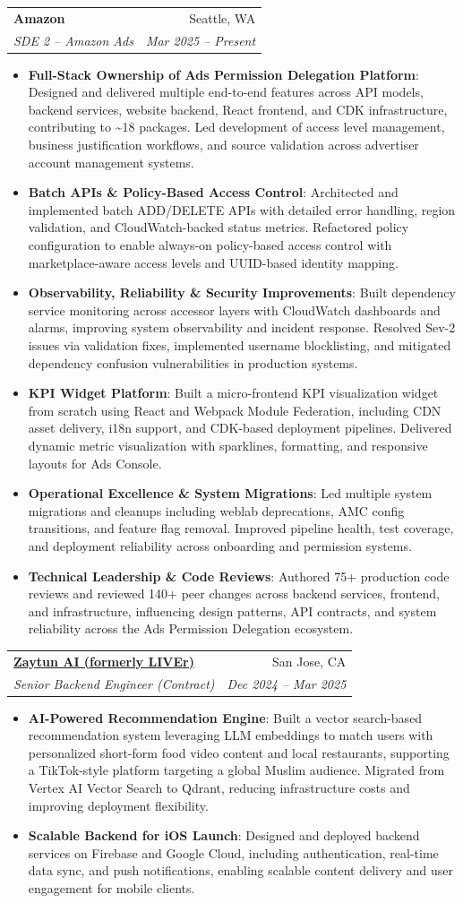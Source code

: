 \documentclass[letterpaper,11pt]{article}
\makeatletter
\newcommand{\resumeItem}[2]{
  \item\small{
    \textbf{#1}{: #2 \vspace{-2pt}}
  }
}
\newcommand{\resumeSubheading}[4]{
  \vspace{-1pt}\item
    \begin{tabular*}{0.97\textwidth}{l@{\extracolsep{\fill}}r}
      \textbf{#1} & #2 \\
      \textit{\small#3} & \textit{\small #4} \\
    \end{tabular*}\vspace{-5pt}
}
\newcommand{\resumeItemListStart}{\begin{itemize}}
\newcommand{\resumeItemListEnd}{\end{itemize}\vspace{-5pt}}
\makeatother
\begin{document}
    \resumeSubheading
      {Amazon}{Seattle, WA}
      {SDE 2 -- Amazon Ads}{Mar 2025 -- Present}
      \resumeItemListStart
        \resumeItem{Full-Stack Ownership of Ads Permission Delegation Platform}
          {Designed and delivered multiple end-to-end features across API models, backend services, website backend, React frontend, and CDK infrastructure, contributing to \textasciitilde18 packages. Led development of access level management, business justification workflows, and source validation across advertiser account management systems.}
        \resumeItem{Batch APIs \& Policy-Based Access Control}
          {Architected and implemented batch ADD/DELETE APIs with detailed error handling, region validation, and CloudWatch-backed status metrics. Refactored policy configuration to enable always-on policy-based access control with marketplace-aware access levels and UUID-based identity mapping.}
        \resumeItem{Observability, Reliability \& Security Improvements}
          {Built dependency service monitoring across accessor layers with CloudWatch dashboards and alarms, improving system observability and incident response. Resolved Sev-2 issues via validation fixes, implemented username blocklisting, and mitigated dependency confusion vulnerabilities in production systems.}
        \resumeItem{KPI Widget Platform}
          {Built a micro-frontend KPI visualization widget from scratch using React and Webpack Module Federation, including CDN asset delivery, i18n support, and CDK-based deployment pipelines. Delivered dynamic metric visualization with sparklines, formatting, and responsive layouts for Ads Console.}
        \resumeItem{Operational Excellence \& System Migrations}
          {Led multiple system migrations and cleanups including weblab deprecations, AMC config transitions, and feature flag removal. Improved pipeline health, test coverage, and deployment reliability across onboarding and permission systems.}
        \resumeItem{Technical Leadership \& Code Reviews}
          {Authored 75+ production code reviews and reviewed 140+ peer changes across backend services, frontend, and infrastructure, influencing design patterns, API contracts, and system reliability across the Ads Permission Delegation ecosystem.}
      \resumeItemListEnd

    \resumeSubheading
      {\href{https://zaytun.ai/}{Zaytun AI (formerly LIVEr)}}{San Jose, CA}
      {Senior Backend Engineer (Contract)}{Dec 2024 -- Mar 2025}
      \resumeItemListStart
        \resumeItem{AI-Powered Recommendation Engine}
          {Built a vector search-based recommendation system leveraging LLM embeddings to match users with personalized short-form food video content and local restaurants, supporting a TikTok-style platform targeting a global Muslim audience. Migrated from Vertex AI Vector Search to Qdrant, reducing infrastructure costs and improving deployment flexibility.}
        \resumeItem{Scalable Backend for iOS Launch}
          {Designed and deployed backend services on Firebase and Google Cloud, including authentication, real-time data sync, and push notifications, enabling scalable content delivery and user engagement for mobile clients.}
      \resumeItemListEnd
\end{document}
